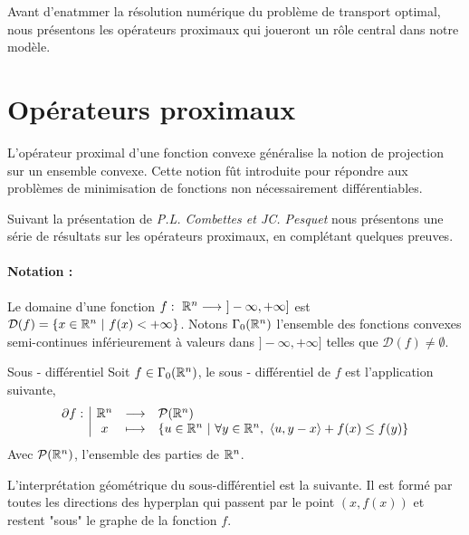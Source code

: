 \documentclass[a4paper,12pt]{article}
\begin{document}
Avant d'enatmmer la résolution numérique du problème de transport optimal, nous présentons les opérateurs proximaux qui joueront un rôle central dans notre modèle. 

\newpage
\section{Opérateurs proximaux}
\label{sec:prox}
L'opérateur proximal d'une fonction convexe généralise la notion de projection sur un ensemble convexe. Cette notion fût introduite pour répondre aux problèmes de minimisation de fonctions non nécessairement différentiables. 

Suivant la présentation de \emph{P.L. Combettes \emph{et} JC. Pesquet} \cite{combettes} nous présentons une série de résultats sur les opérateurs proximaux, en complétant quelques preuves.
\paragraph{Notation :}Le domaine d'une fonction $f:\ \RR^n\longrightarrow\ ]-\infty,+\infty]$ est $\mathcal{D}(f) = \{ x\in\mathbb{R}^n\ |\ f(x) < +\infty \} $. Notons $\Gamma_0(\mathbb{R}^n)$ l'ensemble des fonctions convexes semi-continues inférieurement à valeurs dans $]-\infty,+\infty]$ telles que $\mathcal{D}(f) \neq \emptyset$. 

\begin{definition}{Sous - différentiel}
Soit $f\in\Gamma_0(\mathbb{R}^n)$, le sous - différentiel de $f$ est l'application suivante,
$$
\begin{array}[t]{l|ccl} \partial f: & \mathbb{R}^n & \longrightarrow & \mathcal{P}(\mathbb{R}^n) \\ & x & \longmapsto & \left\{ u\in\mathbb{R}^n\ |\ \forall y\in\mathbb{R}^n,\ \langle u,y-x\rangle +f(x)\leq f(y) \right\} \end{array}
$$ 
Avec $\mathcal{P}(\mathbb{R}^n)$, l'ensemble des parties de $\mathbb{R}^n$.
\end{definition}


L'interprétation géométrique du sous-différentiel est la suivante. Il est formé par toutes les directions des hyperplan qui passent par le point $(x,f(x))$ et restent "sous" le graphe de la fonction $f$. \\
\end{document}
